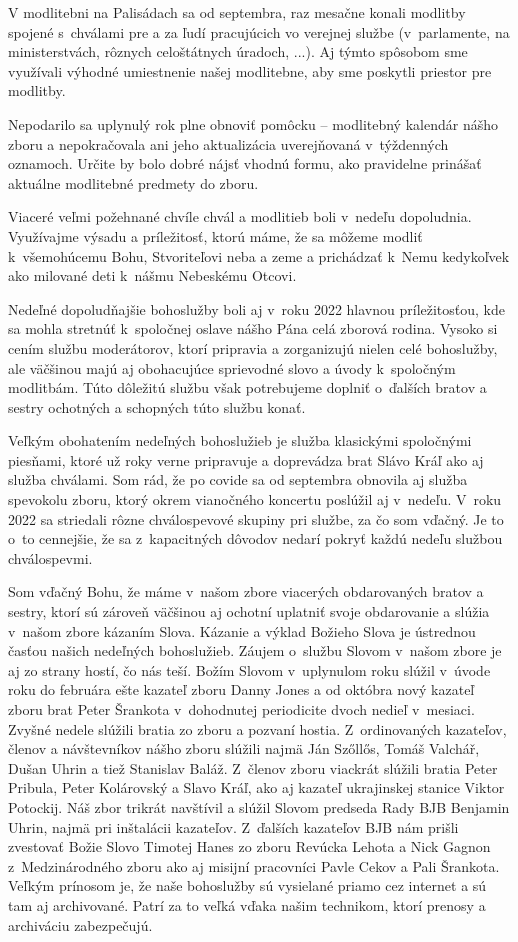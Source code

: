 V modlitebni na Palisádach sa od septembra, raz mesačne konali modlitby spojené s~chválami pre a za ľudí pracujúcich vo verejnej službe (v~parlamente, na ministerstvách, rôznych celoštátnych úradoch, ...). Aj týmto spôsobom sme využívali výhodné umiestnenie našej modlitebne, aby sme poskytli priestor pre modlitby.

Nepodarilo sa uplynulý rok plne obnoviť pomôcku – modlitebný kalendár nášho zboru a nepokračovala ani jeho aktualizácia uverejňovaná v~týždenných oznamoch. Určite by bolo dobré nájsť vhodnú formu, ako pravidelne prinášať aktuálne modlitebné predmety do zboru.

Viaceré veľmi požehnané chvíle chvál a modlitieb boli v~nedeľu dopoludnia. Využívajme výsadu a príležitosť, ktorú máme, že sa môžeme modliť k~všemohúcemu Bohu, Stvoriteľovi neba a zeme a prichádzať k~Nemu kedykoľvek ako milované deti k~nášmu Nebeskému Otcovi.


Nedeľné dopoludňajšie bohoslužby boli aj v~roku 2022 hlavnou príležitosťou, kde sa mohla stretnúť k~spoločnej oslave nášho Pána celá zborová rodina. Vysoko si cením službu moderátorov, ktorí pripravia a zorganizujú nielen celé bohoslužby, ale väčšinou majú aj obohacujúce sprievodné slovo a úvody k~spoločným modlitbám. Túto dôležitú službu však potrebujeme doplniť o~ďalších bratov a sestry ochotných a schopných túto službu konať.

Veľkým obohatením nedeľných bohoslužieb je služba klasickými spoločnými piesňami, ktoré už roky verne pripravuje a doprevádza brat Slávo Kráľ ako aj služba chválami. Som rád, že po covide sa od septembra obnovila aj služba spevokolu zboru, ktorý okrem vianočného koncertu poslúžil aj v~nedeľu. V~roku 2022 sa striedali rôzne chválospevové skupiny pri službe, za čo som vďačný. Je to o~to cennejšie, že sa z~kapacitných dôvodov nedarí pokryť každú nedeľu službou chválospevmi.

Som vďačný Bohu, že máme v~našom zbore viacerých obdarovaných bratov a sestry, ktorí sú zároveň väčšinou aj ochotní uplatniť svoje obdarovanie a slúžia v~našom zbore kázaním Slova. Kázanie a výklad Božieho Slova je ústrednou časťou našich nedeľných bohoslužieb. Záujem o~službu Slovom v~našom zbore je aj zo strany hostí, čo nás teší.
Božím Slovom v~uplynulom roku slúžil v~úvode roku do februára ešte kazateľ zboru Danny Jones a od októbra nový kazateľ zboru brat Peter Šrankota v~dohodnutej periodicite dvoch nedieľ v~mesiaci. Zvyšné nedele slúžili bratia zo zboru a pozvaní hostia. Z~ordinovaných kazateľov, členov a návštevníkov nášho zboru slúžili najmä Ján Szőllős, Tomáš Valchář, Dušan Uhrin a tiež Stanislav Baláž. Z~členov zboru viackrát slúžili bratia Peter Pribula, Peter Kolárovský a Slavo Kráľ, ako aj kazateľ ukrajinskej stanice Viktor Potockij. Náš zbor trikrát navštívil a slúžil Slovom predseda Rady BJB Benjamin Uhrin, najmä pri inštalácii kazateľov. Z~ďalších kazateľov BJB nám prišli zvestovať Božie Slovo Timotej Hanes zo zboru Revúcka Lehota a Nick Gagnon z~Medzinárodného zboru ako aj misijní pracovníci Pavle Cekov a Pali Šrankota.
Veľkým prínosom je, že naše bohoslužby sú vysielané priamo cez internet a sú tam aj archivované. Patrí za to veľká vďaka našim technikom, ktorí prenosy a archiváciu zabezpečujú.

